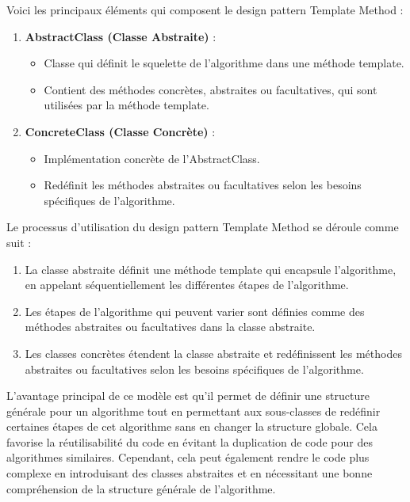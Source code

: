 \documentclass[french]{article}
\begin{document}
Voici les principaux éléments qui composent le design pattern Template Method :

\begin{enumerate}
    \item \textbf{AbstractClass (Classe Abstraite)} :
    \begin{itemize}
        \item Classe qui définit le squelette de l'algorithme dans une méthode template.
        \item Contient des méthodes concrètes, abstraites ou facultatives, qui sont utilisées par la méthode template.
    \end{itemize}
    
    \item \textbf{ConcreteClass (Classe Concrète)} :
    \begin{itemize}
        \item Implémentation concrète de l'AbstractClass.
        \item Redéfinit les méthodes abstraites ou facultatives selon les besoins spécifiques de l'algorithme.
    \end{itemize}
\end{enumerate}

Le processus d'utilisation du design pattern Template Method se déroule comme suit :

\begin{enumerate}
    \item La classe abstraite définit une méthode template qui encapsule l'algorithme, en appelant séquentiellement les différentes étapes de l'algorithme.
    \item Les étapes de l'algorithme qui peuvent varier sont définies comme des méthodes abstraites ou facultatives dans la classe abstraite.
    \item Les classes concrètes étendent la classe abstraite et redéfinissent les méthodes abstraites ou facultatives selon les besoins spécifiques de l'algorithme.
\end{enumerate}

L'avantage principal de ce modèle est qu'il permet de définir une structure générale pour un algorithme tout en permettant aux sous-classes de redéfinir certaines étapes de cet algorithme sans en changer la structure globale. Cela favorise la réutilisabilité du code en évitant la duplication de code pour des algorithmes similaires. Cependant, cela peut également rendre le code plus complexe en introduisant des classes abstraites et en nécessitant une bonne compréhension de la structure générale de l'algorithme.
\end{document}
